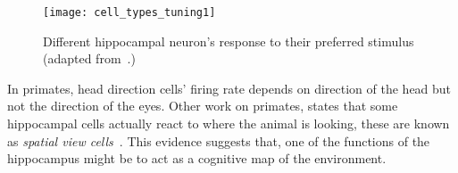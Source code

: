 \begin{figure}[h]
  \begin{center}
    \texttt{[image: cell\_types\_tuning1]}
    \caption{Different hippocampal neuron's response to their preferred stimulus (adapted from~\cite{kloosterman-images}.)}
  \end{center}
\end{figure}

In primates, head direction cells' firing rate depends on direction of the head but not the direction of the eyes. Other work on primates, states that some hippocampal cells actually react to where the animal is looking, these are known as \emph{spatial view cells}~\cite{rolls2006spatial}. This evidence suggests that, one of the functions of the hippocampus might be to act as a cognitive map of the environment. 

